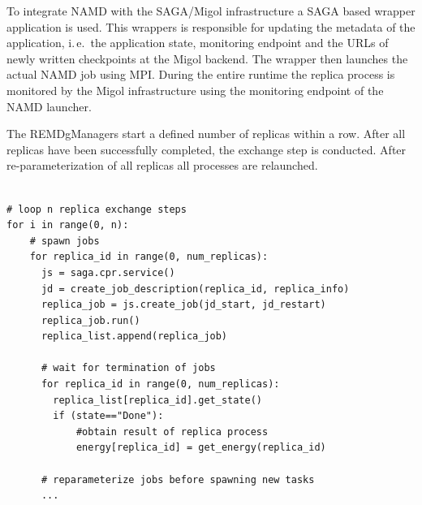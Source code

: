 \documentclass[times, 10pt,twocolumn]{article}
\newcommand{\jhanote}[1]{ {\textcolor{red} { ***SJ: #1 }}}
\begin{document}
To integrate NAMD with the SAGA/Migol infrastructure a SAGA based wrapper application is used. This wrappers is responsible for updating the metadata of the application, i.\,e.\ the application state, monitoring endpoint and the URLs of newly written checkpoints at the Migol backend. The wrapper then launches the actual NAMD job using MPI. During the entire runtime the replica process is monitored by the Migol infrastructure using the monitoring endpoint of the NAMD launcher.

The REMDgManagers start a defined number of replicas within a row. After all replicas have been successfully completed, the exchange step is conducted. After re-parameterization of all replicas all processes are relaunched.

                                             
\begin{lstlisting}[style=myPythonListing, caption={REMDgManager: Replica Orchestration}, 
label={lst:python_saga_chkpt_reg}]

# loop n replica exchange steps  
for i in range(0, n):     
    # spawn jobs
    for replica_id in range(0, num_replicas):
      js = saga.cpr.service()
      jd = create_job_description(replica_id, replica_info)    
      replica_job = js.create_job(jd_start, jd_restart)
      replica_job.run()
      replica_list.append(replica_job)
     
      # wait for termination of jobs
      for replica_id in range(0, num_replicas):     
        replica_list[replica_id].get_state()
        if (state=="Done"):                          
            #obtain result of replica process
            energy[replica_id] = get_energy(replica_id)
 
      # reparameterize jobs before spawning new tasks      
      ...                    
\end{lstlisting}
\end{document}
